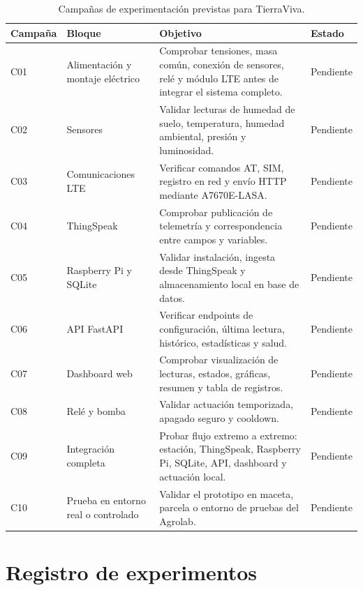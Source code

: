 \begin{table}[H]
\centering
\renewcommand{\arraystretch}{1.25}
\small
\begin{tabular}{|p{}|p{}|p{}|p{}|}
\hline
\rowcolor{gray!20}
\textbf{Campaña} & \textbf{Bloque} & \textbf{Objetivo} & \textbf{Estado} \\
\hline
C01 & Alimentación y montaje eléctrico & Comprobar tensiones, masa común, conexión de sensores, relé y módulo LTE antes de integrar el sistema completo. & Pendiente \\
\hline
C02 & Sensores & Validar lecturas de humedad de suelo, temperatura, humedad ambiental, presión y luminosidad. & Pendiente \\
\hline
C03 & Comunicaciones LTE & Verificar comandos AT, SIM, registro en red y envío HTTP mediante A7670E-LASA. & Pendiente \\
\hline
C04 & ThingSpeak & Comprobar publicación de telemetría y correspondencia entre campos y variables. & Pendiente \\
\hline
C05 & Raspberry Pi y SQLite & Validar instalación, ingesta desde ThingSpeak y almacenamiento local en base de datos. & Pendiente \\
\hline
C06 & API FastAPI & Verificar endpoints de configuración, última lectura, histórico, estadísticas y salud. & Pendiente \\
\hline
C07 & Dashboard web & Comprobar visualización de lecturas, estados, gráficas, resumen y tabla de registros. & Pendiente \\
\hline
C08 & Relé y bomba & Validar actuación temporizada, apagado seguro y cooldown. & Pendiente \\
\hline
C09 & Integración completa & Probar flujo extremo a extremo: estación, ThingSpeak, Raspberry Pi, SQLite, API, dashboard y actuación local. & Pendiente \\
\hline
C10 & Prueba en entorno real o controlado & Validar el prototipo en maceta, parcela o entorno de pruebas del Agrolab. & Pendiente \\
\hline
\end{tabular}
\caption{Campañas de experimentación previstas para TierraViva.}
\label{tab:campanas_experimentacion}
\end{table}

\section{Registro de experimentos}

